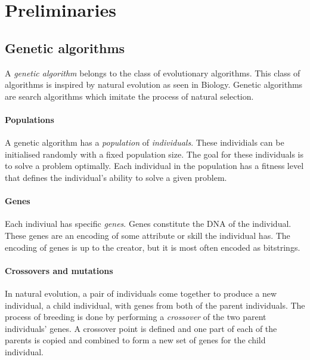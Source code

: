 \section{Preliminaries}
\label{sec:preliminaries}


\subsection{Genetic algorithms}

A \emph{genetic algorithm} belongs to the class of evolutionary algorithms.
This class of algorithms is inspired by natural evolution as seen in Biology.
Genetic algorithms are search algorithms which imitate the process of natural selection.

\paragraph{Populations}

A genetic algorithm has a \emph{population} of \emph{individuals}.
These individials can be initialised randomly with a fixed population size.
The goal for these individuals is to solve a problem optimally.
Each individual in the population has a fitness level that defines the individual's ability to solve a given problem.

\paragraph{Genes}

Each indiviual has specific \emph{genes}.
Genes constitute the DNA of the individual.
These genes are an encoding of some attribute or skill the individual has.
The encoding of genes is up to the creator, but it is most often encoded as bitstrings.

\paragraph{Crossovers and mutations}

In natural evolution, a pair of individuals come together to produce a new individual, a child individual, with genes from both of the parent individuals.
The process of breeding is done by performing a \emph{crossover} of the two parent individuals' genes.
A crossover point is defined and one part of each of the parents is copied and combined to form a new set of genes for the child individual.


